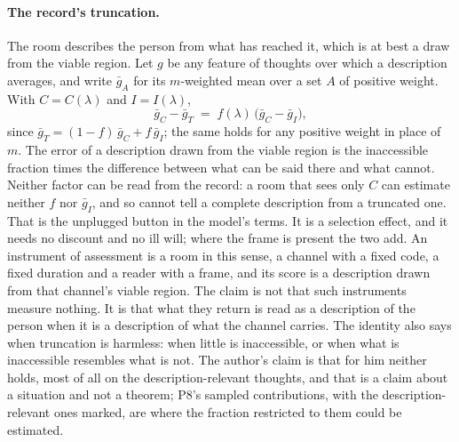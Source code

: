 \paragraph{The record's truncation.} The room describes the person from what has reached it, which is at best a draw from the viable region. Let $g$ be any feature of thoughts over which a description averages, and write $\bar{g}_A$ for its $m$-weighted mean over a set $A$ of positive weight. With $C = C(\lambda)$ and $I = I(\lambda)$,
\[
\bar{g}_{C} - \bar{g}_{T} \;=\; f(\lambda)\,\big(\bar{g}_{C} - \bar{g}_{I}\big),
\]
since $\bar{g}_T = (1 - f)\,\bar{g}_C + f\,\bar{g}_I$; the same holds for any positive weight in place of $m$. The error of a description drawn from the viable region is the inaccessible fraction times the difference between what can be said there and what cannot. Neither factor can be read from the record: a room that sees only $C$ can estimate neither $f$ nor $\bar{g}_I$, and so cannot tell a complete description from a truncated one. That is the unplugged button in the model's terms. It is a selection effect, and it needs no discount and no ill will; where the frame is present the two add. An instrument of assessment is a room in this sense, a channel with a fixed code, a fixed duration and a reader with a frame, and its score is a description drawn from that channel's viable region. The claim is not that such instruments measure nothing. It is that what they return is read as a description of the person when it is a description of what the channel carries. The identity also says when truncation is harmless: when little is inaccessible, or when what is inaccessible resembles what is not. The author's claim is that for him neither holds, most of all on the description-relevant thoughts, and that is a claim about a situation and not a theorem; P8's sampled contributions, with the description-relevant ones marked, are where the fraction restricted to them could be estimated.

